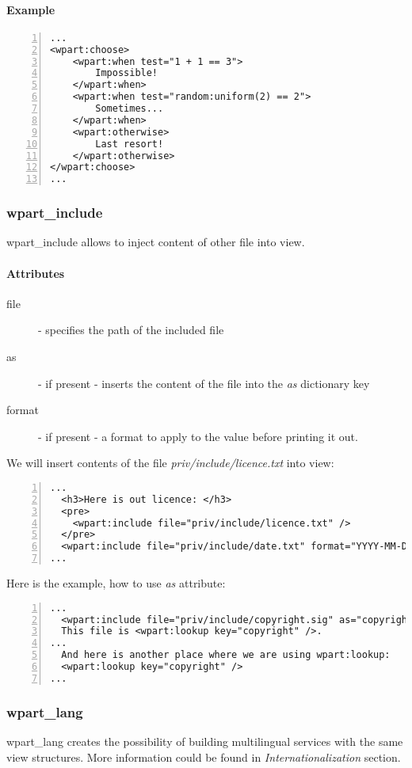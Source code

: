 \paragraph{Example}
\begin{Verbatim}[numbers=left, frame=single, label=choose.html]
...
<wpart:choose>
    <wpart:when test="1 + 1 == 3">
        Impossible!
    </wpart:when>
    <wpart:when test="random:uniform(2) == 2">
        Sometimes...
    </wpart:when>
    <wpart:otherwise>
        Last resort!
    </wpart:otherwise>
</wpart:choose>
...
\end{Verbatim}

\subsubsection{wpart\_include} wpart\_include allows to inject content of other file into view. 
\paragraph{Attributes}
\begin{description}
\item[file]- specifies the path of the included file
\item[as]- if present - inserts the content of the file into the {\it as} dictionary key
\item[format] - if present - a format to apply to the value before printing it out. 
\end{description}

We will insert contents of the file {\it priv/include/licence.txt} into view:
\begin{Verbatim}[numbers=left, frame=single, label=licence.html]
...
  <h3>Here is out licence: </h3>
  <pre>
    <wpart:include file="priv/include/licence.txt" />
  </pre>
  <wpart:include file="priv/include/date.txt" format="YYYY-MM-DD" />
...
\end{Verbatim}

Here is the example, how to use {\it as} attribute:
\begin{Verbatim}[numbers=left, frame=single, label=copyright.html]
...
  <wpart:include file="priv/include/copyright.sig" as="copyright" />
  This file is <wpart:lookup key="copyright" />.
...
  And here is another place where we are using wpart:lookup: 
  <wpart:lookup key="copyright" />
...
\end{Verbatim}

\subsubsection{wpart\_lang} wpart\_lang creates the possibility of building multilingual services with the same view structures. More information could be found in {\it Internationalization} section.
